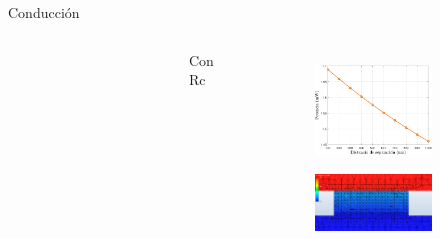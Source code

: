 \documentclass[spanish,a4paper]{beamer}%
\begin{document}
\begin{frame}{Conducción}
\begin{columns}
\begin{figure}
\begin{subfigure}[b]{0.82\columnwidth}
							\end{subfigure}
							\label{fig:SiSiO2Si_cond}%
					\end{figure}
			\vspace{-10pt}
					\begin{block}{\centering Con Rc}
					\end{block}
			\vspace{-10pt}
			\begin{figure}%
			\centering
			\begin{subfigure}[b]{0.9\columnwidth}
				\includegraphics[width=\textwidth]{Prc2_SiSiO2Si}%
			\end{subfigure}
				\hfill \vfill
			\begin{subfigure}[b]{0.8\columnwidth}
				\includegraphics[width=\textwidth]{SiSiO2Si_1000nm_Plane_Rc}
			\end{subfigure}
				\label{fig:SiSiO2Si_condRc}%
			\end{figure}
			\end{columns}			
					
		\end{frame}
\end{document}
